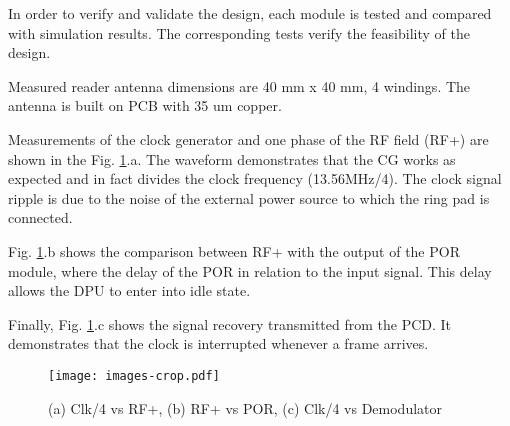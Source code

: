 In order to verify and validate the design, each module is tested and compared with simulation results. The corresponding tests verify the feasibility of the design.

Measured reader antenna dimensions \cite{nfc_test} are 40 mm x 40 mm, 4 windings. The antenna is built on PCB with 35 um copper.

Measurements of the clock generator and one phase of the RF field (RF+) are shown in the Fig. \ref{fig:meas}.a. The waveform demonstrates that the CG works as expected and in fact divides the clock frequency (13.56MHz/4). The clock signal ripple is due to the noise of the external power source to which the ring pad is connected. 

Fig. \ref{fig:meas}.b shows the comparison between RF+ with the output of the POR module, where the delay of the POR in relation to the input signal. This delay allows the DPU to enter into idle state.

Finally, Fig. \ref{fig:meas}.c shows the signal recovery transmitted from the PCD. It demonstrates that the clock is interrupted whenever a frame arrives.

\begin{figure}[h]
  \centering
  \texttt{[image: images-crop.pdf]}
  \caption{(a) Clk/4 vs RF+, (b) RF+ vs POR, (c) Clk/4 vs Demodulator}
  \label{fig:meas}
\end{figure}